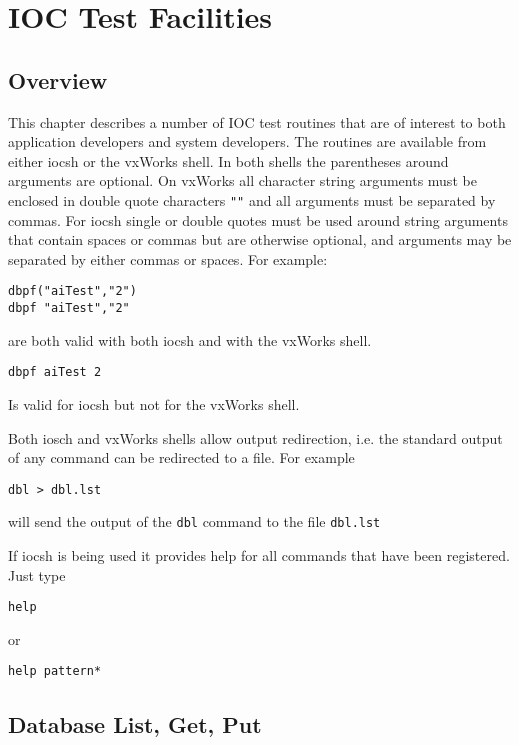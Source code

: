 \chapter{IOC Test Facilities}

\section{Overview}

This chapter describes a number of IOC test routines that are of interest to both application developers and system 
developers. The routines are available from either iocsh or the vxWorks shell. In both shells the parentheses around 
arguments are optional. On vxWorks all character string arguments must be enclosed in double quote characters \verb|""| and 
all arguments must be separated by commas. For iocsh single or double quotes must be used around string arguments that 
contain spaces or commas but are otherwise optional, and arguments may be separated by either commas or spaces. For 
example:

\begin{verbatim}dbpf("aiTest","2")
dbpf "aiTest","2"
\end{verbatim}are both valid with both iocsh and with the vxWorks shell.

\begin{verbatim}dbpf aiTest 2
\end{verbatim}Is valid for iocsh but not for the vxWorks shell.

Both iosch and vxWorks shells allow output redirection, i.e. the standard output of any command can be redirected to a 
file. For example

\begin{verbatim}dbl > dbl.lst
\end{verbatim}will send the output of the \verb|dbl| command to the file \verb|dbl.lst|

If iocsh is being used it provides help for all commands that have been registered. Just type

\begin{verbatim}help
\end{verbatim}or

\begin{verbatim}help pattern*
\end{verbatim}\section{Database List, Get, Put}

